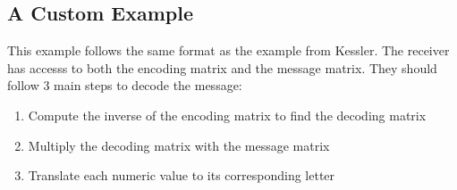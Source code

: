 \documentclass{article}
\begin{document}
\subsection{A Custom Example}
This example follows the same format as the example from Kessler. The receiver has accesss to both the encoding matrix and the message matrix. They should follow 3 main steps to decode the message:\\

\begin{enumerate}
    \item Compute the inverse of the encoding matrix to find the decoding matrix
    \item Multiply the decoding matrix with the message matrix
    \item Translate each numeric value to its corresponding letter
\end{enumerate}
\end{document}
